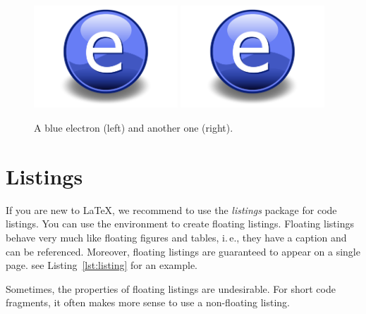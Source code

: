 \begin{figure}[t]
\centering
\includegraphics[width=0.48\textwidth]{Figures/Electron}%
\hspace{\fill}%
\includegraphics[width=0.48\textwidth]{Figures/Electron}
\decoRule
\caption{A blue electron (left) and another one (right).}
\label{fig:sidebyside}
\end{figure}


\section{Listings}

If you are new to LaTeX, we recommend to use the \emph{listings} package for code listings. You can use the environment  to create floating listings. Floating listings behave very much like floating figures and tables, i.\,e., they have a caption and can be referenced. Moreover, floating listings are guaranteed to appear on a single page. see Listing~\ref{lst:listing} for an example.

Sometimes, the properties of floating listings are undesirable. For short code fragments, it often makes more sense to use a non-floating listing.


